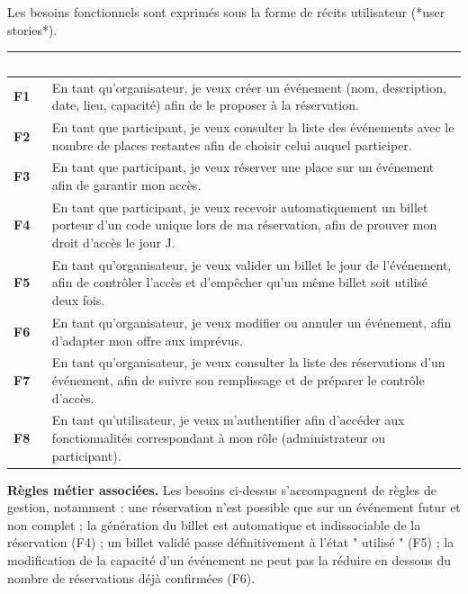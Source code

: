 \documentclass[12pt,a4paper]{report}
\begin{document}
Les besoins fonctionnels sont exprimés sous la forme de récits utilisateur (*user stories*).

\begin{center}\small
\begin{longtable}{|p{7.50cm}|p{7.50cm}|}
\hline
\rowcolor{entetetable}
\textbf{\textcolor{white}{Réf.}} & \textbf{\textcolor{white}{Récit utilisateur}} \\ \hline
\textbf{F1} & En tant qu'organisateur, je veux créer un événement (nom, description, date, lieu, capacité) afin de le proposer à la réservation. \\ \hline
\textbf{F2} & En tant que participant, je veux consulter la liste des événements avec le nombre de places restantes afin de choisir celui auquel participer. \\ \hline
\textbf{F3} & En tant que participant, je veux réserver une place sur un événement afin de garantir mon accès. \\ \hline
\textbf{F4} & En tant que participant, je veux recevoir automatiquement un billet porteur d'un code unique lors de ma réservation, afin de prouver mon droit d'accès le jour J. \\ \hline
\textbf{F5} & En tant qu'organisateur, je veux valider un billet le jour de l'événement, afin de contrôler l'accès et d'empêcher qu'un même billet soit utilisé deux fois. \\ \hline
\textbf{F6} & En tant qu'organisateur, je veux modifier ou annuler un événement, afin d'adapter mon offre aux imprévus. \\ \hline
\textbf{F7} & En tant qu'organisateur, je veux consulter la liste des réservations d'un événement, afin de suivre son remplissage et de préparer le contrôle d'accès. \\ \hline
\textbf{F8} & En tant qu'utilisateur, je veux m'authentifier afin d'accéder aux fonctionnalités correspondant à mon rôle (administrateur ou participant). \\ \hline
\end{longtable}\end{center}

\textbf{Règles métier associées.} Les besoins ci-dessus s'accompagnent de règles de gestion, notamment : une réservation n'est possible que sur un événement futur et non complet ; la génération du billet est automatique et indissociable de la réservation (F4) ; un billet validé passe définitivement à l'état " utilisé " (F5) ; la modification de la capacité d'un événement ne peut pas la réduire en dessous du nombre de réservations déjà confirmées (F6).
\end{document}
